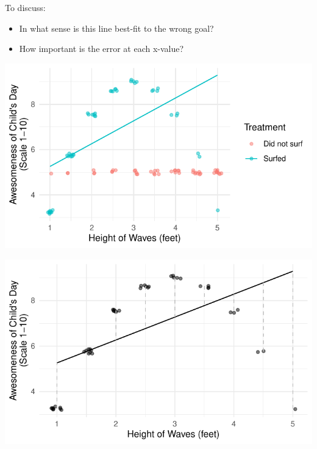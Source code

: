 \documentclass{beamer}
\begin{document}
\begin{frame}

To discuss:
\begin{itemize}
\item In what sense is this line best-fit to the wrong goal?
\item How important is the error at each x-value?
\end{itemize}

\includegraphics[width = \textwidth]{figures/dr_bestFitLine}

\end{frame}

\begin{frame}

\includegraphics[width = \textwidth]{figures/dr_observedError}

\end{frame}
\end{document}

